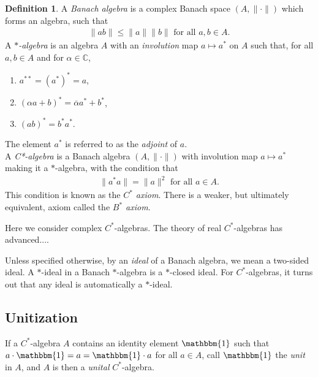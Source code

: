 \documentclass[12pt,a4paper]{amsart}
\theoremstyle{plain}
\theoremstyle{definition}
\newtheorem{defn}{Definition}
\newcommand{\1}{\mathbbm{1}}
\newcommand{\C}{\mathbb{C}}
\begin{document}
\begin{defn}
	A \emph{Banach algebra} is a complex Banach space $(A,\|\cdot\|)$ which forms an 
	algebra, such that 
	\begin{align*}
		\|ab\| \leq \|a\| \|b\| \mbox{ for all } a,b \in A.
	\end{align*}
	A \emph{$\ast$-algebra} is an algebra $A$ with an \emph{involution} map 
	$a \mapsto a^\ast$ on $A$ such that, for all $a,b \in A$ and for $\alpha \in \C$,
	\renewcommand{\labelenumi}{(\roman{enumi})}
	\begin{enumerate}
		\item $a^{\ast\ast} = (a^\ast)^\ast = a$,
		\item $(\alpha a+b)^\ast = \overline{\alpha} a^\ast + b^\ast$,
		\item $(ab)^\ast = b^\ast a^\ast$.
	\end{enumerate}
	The element $a^\ast$ is referred to as the \emph{adjoint} of $a$. 		\\
	A \emph{C*-algebra} is a Banach algebra $(A, \| \cdot \|)$ with involution 
	map $a \mapsto a^\ast$ making it a $\ast$-algebra, with the condition that
	\begin{align*}
		\|a ^\ast a\| = \|a\|^2 \mbox{ for all } a \in A.
	\end{align*}
	This condition is known as the \emph{$C^\ast$ axiom}. There is a weaker, but 
	ultimately equivalent, axiom called the \emph{$B^\ast$ axiom}. %
\end{defn}
Here we consider complex $C^\ast$-algebras. The theory of real $C^\ast$-algebras has advanced....

Unless specified otherwise, by an \emph{ideal} of a Banach algebra, we mean a two-sided ideal.
A $\ast$-ideal in a Banach $\ast$-algebra is a $\ast$-closed ideal. 
For $C^\ast$-algebras, it turns out that any ideal is automatically a $\ast$-ideal.%

\subsection{Unitization}
If a $C^\ast$-algebra $A$ contains an identity element $\1$ such that 
$a\cdot \1 = a = \1 \cdot a$ for all $a \in A$, call $\1$ the \emph{unit} 
in $A$, and $A$ is then a \emph{unital} $C^\ast$-algebra.
\end{document}
